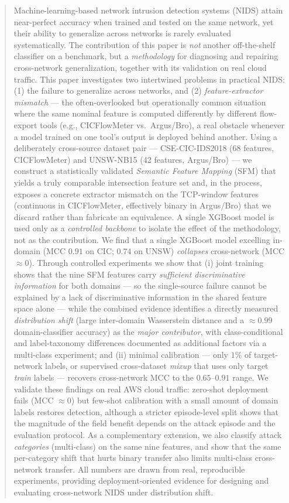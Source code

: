 \documentclass[preprint,12pt,authoryear]{elsarticle}
\begin{document}
\begin{frontmatter}
\begin{abstract}
Machine-learning-based network intrusion detection systems (NIDS) attain
near-perfect accuracy when trained and tested on the same network, yet their
ability to generalize across networks is rarely evaluated systematically. The
contribution of this paper is \emph{not} another off-the-shelf classifier on a
benchmark, but a \emph{methodology} for diagnosing and repairing cross-network
generalization, together with its validation on real cloud traffic. This paper
investigates two intertwined problems in practical NIDS: (1) the failure to
generalize across networks, and (2) \emph{feature-extractor mismatch} --- the
often-overlooked but operationally common situation where the same nominal feature
is computed differently by different flow-export tools (e.g., CICFlowMeter vs.\
Argus/Bro), a real obstacle whenever a model trained on one tool's output is
deployed behind another. Using a deliberately cross-source dataset pair ---
CSE-CIC-IDS2018 (68 features, CICFlowMeter) and UNSW-NB15 (42 features, Argus/Bro)
--- we construct a statistically validated \emph{Semantic Feature Mapping} (SFM)
that yields a truly comparable intersection feature set and, in the process,
exposes a concrete extractor mismatch on the TCP-window features (continuous in
CICFlowMeter, effectively binary in Argus/Bro) that we discard rather than
fabricate an equivalence. A single XGBoost model is used only as a
\emph{controlled backbone} to isolate the effect of the methodology, not as the
contribution. We find that a single XGBoost model
excelling in-domain (MCC $0.91$ on CIC; $0.74$ on UNSW) \emph{collapses}
cross-network (MCC $\approx 0$). Through controlled experiments we show that
(i) joint training shows that the nine SFM features carry \emph{sufficient
discriminative information} for both domains --- so the single-source failure
cannot be explained by a lack of discriminative information in the shared feature
space alone --- while the combined evidence identifies a directly measured
\emph{distribution shift} (large inter-domain Wasserstein distance and a
$\approx 0.99$ domain-classifier accuracy) as the \emph{major contributor}, with
class-conditional and label-taxonomy differences documented as additional factors
via a multi-class experiment; and (ii) minimal calibration --- only $1\%$ of
target-network labels, or supervised cross-dataset \emph{mixup} that uses only
target \emph{train} labels --- recovers cross-network MCC to the $0.65$--$0.91$
range. We validate these findings on real AWS cloud traffic: zero-shot deployment
fails (MCC $\approx 0$) but few-shot calibration with a small amount of domain
labels restores detection, although a stricter episode-level split shows that the
magnitude of the field benefit depends on the attack episode and the evaluation
protocol. As a complementary extension, we also classify attack \emph{categories}
(multi-class) on the same nine features, and show that the same per-category shift
that hurts binary transfer also limits multi-class cross-network transfer. All
numbers are drawn from real, reproducible experiments, providing deployment-oriented
evidence for designing and evaluating cross-network NIDS under distribution shift.
\end{abstract}


\end{frontmatter}
\end{document}
